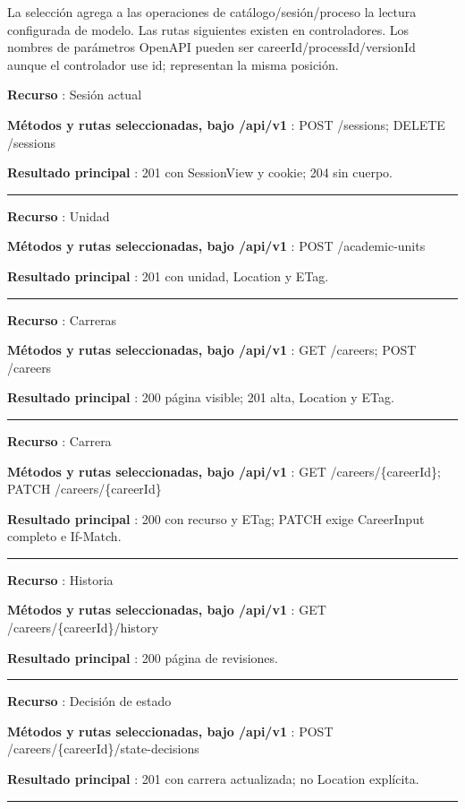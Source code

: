 \documentclass[11pt,a4paper]{article}
\begin{document}
La selección agrega a las operaciones de catálogo/sesión/proceso la
lectura configurada de modelo. Las rutas siguientes existen en
controladores. Los nombres de parámetros OpenAPI pueden ser
careerId/processId/versionId aunque el controlador use id; representan
la misma posición.

\textbf{Recurso }: Sesión actual

\textbf{Métodos y rutas seleccionadas, bajo /api/v1 }: POST /sessions;
DELETE /sessions

\textbf{Resultado principal }: 201 con SessionView y cookie; 204 sin
cuerpo.

\medskip\hrule\medskip

\textbf{Recurso }: Unidad

\textbf{Métodos y rutas seleccionadas, bajo /api/v1 }: POST
/academic-units

\textbf{Resultado principal }: 201 con unidad, Location y ETag.

\medskip\hrule\medskip

\textbf{Recurso }: Carreras

\textbf{Métodos y rutas seleccionadas, bajo /api/v1 }: GET /careers;
POST /careers

\textbf{Resultado principal }: 200 página visible; 201 alta, Location y
ETag.

\medskip\hrule\medskip

\textbf{Recurso }: Carrera

\textbf{Métodos y rutas seleccionadas, bajo /api/v1 }: GET
/careers/\{careerId\}; PATCH /careers/\{careerId\}

\textbf{Resultado principal }: 200 con recurso y ETag; PATCH exige
CareerInput completo e If-Match.

\medskip\hrule\medskip

\textbf{Recurso }: Historia

\textbf{Métodos y rutas seleccionadas, bajo /api/v1 }: GET
/careers/\{careerId\}/history

\textbf{Resultado principal }: 200 página de revisiones.

\medskip\hrule\medskip

\textbf{Recurso }: Decisión de estado

\textbf{Métodos y rutas seleccionadas, bajo /api/v1 }: POST
/careers/\{careerId\}/state-decisions

\textbf{Resultado principal }: 201 con carrera actualizada; no Location
explícita.

\medskip\hrule\medskip
\end{document}
